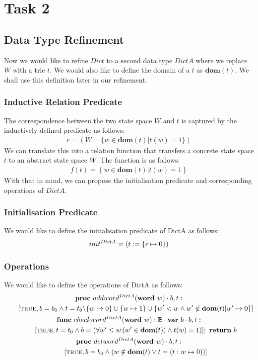 \documentclass[a4paper,12pt,fleqn]{scrartcl}
\newcommand{\domt}{\textbf{dom}(t)}
\newcommand{\WORD}{\textbf{word }}
\begin{document}
\section{Task 2}
\subsection{Data Type Refinement}
Now we would like to refine $Dict$ to a second data type $DictA$ where we 
replace $W$ with a trie $t$. We would also like to define the domain of a $t$ as
$\domt$. We shall use this definition later in our refinement.
\subsubsection{Inductive Relation Predicate}
The correspondence between the two state space $W$ and $t$ is captured by the 
inductively defined predicate as follows:
\begin{gather*}
    r = (W = 
    \{ 
        w \in \domt| t(w)=1
    \})
\end{gather*}
We can translate this into a relation function that transfers a concrete 
state space $t$ to an abstract state space $W$. The function is as follows:
\begin{gather*}
    f(t) = 
    \left\{
        w \in  \domt | t(w) = 1
    \right\}
\end{gather*}
With that in mind, we can propose the initialisation predicate and corresponding
operations of $DictA$.
\subsubsection{Initialisation Predicate}
We would like to define the initialisation predicate of DictA as follows:
\begin{gather*}
    init^{DictA} = (t\mathrel{:=}\{\epsilon\mapsto 0\}) 
\end{gather*}
\subsubsection{Operations}
We would like to define the operations of DictA as follows:
\begin{gather*}
    \PROC\ addword^{DictA}(\WORD w)\cdot b, t:\\
        \qquad [\True, b = b_0\And t = {t_0\backslash\{w\mapsto 0 \} \cup\{w\mapsto 1\}\cup\{w' < w\And 
                    w'\notin \domt | w'\mapsto 0\}}]\\ 
    \FUNC\ checkword^{DictA}(\WORD w):\mathbb{B}\cdot
        \VAR\ b\cdot b, t:\\
        \qquad[\True, t = t_0\And b = (\All{w' \leq w}{w'\in \domt} \And t(w)=1)];\ \RETURN\ b\\
    \PROC\ delword^{DictA}(\WORD w)\cdot b, t:\\
        \qquad[\True , b = b_0\And
        (w \notin \domt \OR t = (t: w \mapsto 0))]\\ 
\end{gather*} 
\end{document}
